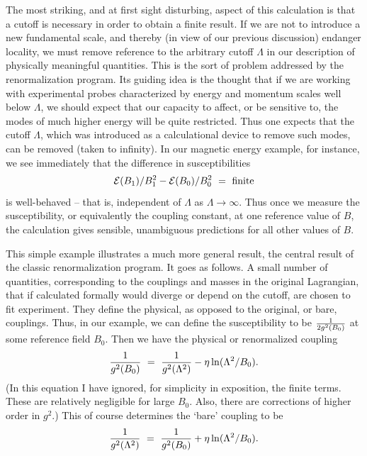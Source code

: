 \documentclass[12pt]{article}
\begin{document}
The most striking, and at first sight
disturbing, aspect of this calculation is that a cutoff is necessary
in order to obtain a finite result.  If we are not to introduce a new
fundamental scale, and thereby (in view of our previous discussion) endanger
locality, we must remove reference to the arbitrary cutoff $\Lambda$
in our description of physically meaningful quantities.  This is the
sort of problem addressed by the renormalization program.  Its guiding
idea is the thought that if we are working with experimental probes
characterized by energy and momentum scales well below $\Lambda$, we
should expect that our capacity to affect, or be sensitive to, the
modes of much higher energy will be quite restricted.  Thus one
expects that the cutoff $\Lambda$, which was
introduced as a calculational device to remove such modes, can be
removed (taken to infinity).  In our magnetic energy example, for
instance, we see immediately that the difference in
susceptibilities
\begin{equation}
{\cal E}(B_1) /B_1^2 - {\cal
E}(B_0)/B_0^2 ~=~ {\rm finite}
\end{equation}
is well-behaved -- that
is, independent of $\Lambda$ as $\Lambda \rightarrow \infty$.  Thus
once we measure the susceptibility, or equivalently the coupling
constant, at one reference value of $B$, the calculation gives
sensible, unambiguous predictions for all other values of $B$.  

This
simple example illustrates a much more general result, the central
result of the classic renormalization program.  It goes as follows.  A
small number of quantities, corresponding to the couplings and masses
in the original Lagrangian, that if calculated formally would diverge
or depend on the cutoff, are chosen to fit experiment.  They define
the physical, as opposed to the original, or bare, couplings.  Thus,
in our example, we can define the susceptibility to be ${1\over 2
g^2(B_0)}$ at some reference field $B_0$.  Then we have the physical or
renormalized coupling
\begin{equation}
{1\over g^2(B_0)} ~=~ {1\over
g^2(\Lambda^2) } - \eta \ln
(\Lambda^2/B_0).\label{eq:dfncouple}
\end{equation}
(In this equation I
have ignored, for simplicity in exposition, the finite terms.  These
are relatively negligible for large $B_0$.  Also, there are
corrections of higher order in $g^2$.) This of course determines the
`bare' coupling to be
\begin{equation}{1\over g^2(\Lambda^2)} ~=~
{1\over g^2(B_0)} +\eta \ln
(\Lambda^2/B_0).\label{eq:barecouple}
\end{equation}
\end{document}
